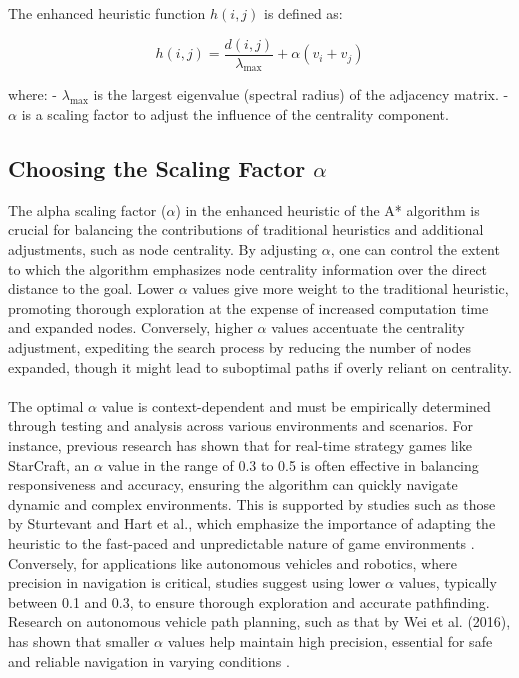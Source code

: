 \documentclass[12pt]{article}
\begin{document}
The enhanced heuristic function \( h(i, j) \) is defined as:

\[
h(i, j) = \frac{d(i, j)}{\lambda_{\max}} + \alpha (v_i + v_j)
\]

where:
- \( \lambda_{\max} \) is the largest eigenvalue (spectral radius) of the adjacency matrix.
- \( \alpha \) is a scaling factor to adjust the influence of the centrality component.
\newpage
\subsection*{Choosing the Scaling Factor \(\alpha\)}

The alpha scaling factor (\(\alpha\)) in the enhanced heuristic of the A* algorithm is crucial for balancing the contributions of traditional heuristics and additional adjustments, such as node centrality. By adjusting \(\alpha\), one can control the extent to which the algorithm emphasizes node centrality information over the direct distance to the goal. Lower \(\alpha\) values give more weight to the traditional heuristic, promoting thorough exploration at the expense of increased computation time and expanded nodes. Conversely, higher \(\alpha\) values accentuate the centrality adjustment, expediting the search process by reducing the number of nodes expanded, though it might lead to suboptimal paths if overly reliant on centrality.
\\\\
The optimal \(\alpha\) value is context-dependent and must be empirically determined through testing and analysis across various environments and scenarios. For instance, previous research has shown that for real-time strategy games like StarCraft, an \(\alpha\) value in the range of 0.3 to 0.5 is often effective in balancing responsiveness and accuracy, ensuring the algorithm can quickly navigate dynamic and complex environments. This is supported by studies such as those by Sturtevant and Hart et al., which emphasize the importance of adapting the heuristic to the fast-paced and unpredictable nature of game environments \cite{Sturtevant, Hart}. Conversely, for applications like autonomous vehicles and robotics, where precision in navigation is critical, studies suggest using lower \(\alpha\) values, typically between 0.1 and 0.3, to ensure thorough exploration and accurate pathfinding. Research on autonomous vehicle path planning, such as that by Wei et al. (2016), has shown that smaller \(\alpha\) values help maintain high precision, essential for safe and reliable navigation in varying conditions \cite{Wei}.
\end{document}
